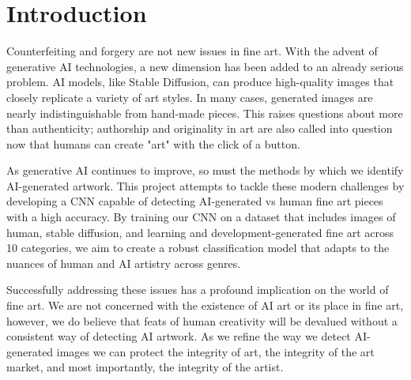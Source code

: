 \section{Introduction}

\par Counterfeiting and forgery are not new issues in fine art. With the advent of generative AI technologies, a new dimension has been added to an already serious problem. AI models, like Stable Diffusion, can produce high-quality images that closely replicate a variety of art styles. In many cases, generated images are nearly indistinguishable from hand-made pieces. This raises questions about more than authenticity; authorship and originality in art are also called into question now that humans can create "art" with the click of a button. 
\\
\par As generative AI continues to improve, so must the methods by which we identify AI-generated artwork. This project attempts to tackle these modern challenges by developing a CNN capable of detecting AI-generated vs human fine art pieces with a high accuracy. By training our CNN on a dataset that includes images of human, stable diffusion, and learning and development-generated fine art across 10 categories, we aim to create a robust classification model that adapts to the nuances of human and AI artistry across genres. 
\\
\par Successfully addressing these issues has a profound implication on the world of fine art. We are not concerned with the existence of AI art or its place in fine art, however, we do believe that feats of human creativity will be devalued without a consistent way of detecting AI artwork. As we refine the way we detect AI-generated images we can protect the integrity of art, the integrity of the art market, and most importantly, the integrity of the artist.


